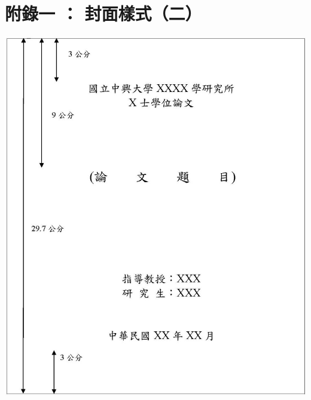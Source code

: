 \chapter{附錄一 ： 封面樣式（二）}
    \begin{center}
        \includegraphics[bb=0 0 1223 1457,width=\textwidth]{TitlePage2.jpg}
    \end{center}

